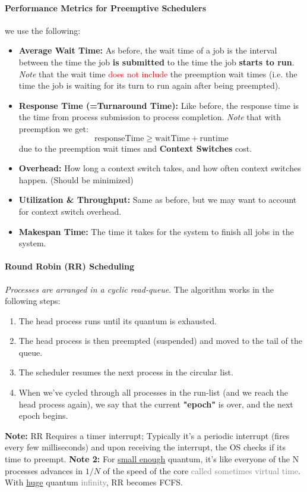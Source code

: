 \documentclass[openany,12pt]{book}
\newcommand{\red}[1]{\textcolor{Red}{#1}}
\newcommand{\gray}[1]{\textcolor{gray}{#1}}
\begin{document}
\paragraph{Performance Metrics for Preemptive Schedulers} we use the following:
\begin{itemize}
  \item \textbf{Average Wait Time:} As before, the wait time of a job is the interval between the time the job \textbf{is submitted} to the time the job \textbf{starts to run}. \textit{Note} that the wait time \red{does not include} the preemption wait times (i.e. the time the job is waiting for its turn to run again after being preempted).

  \item \textbf{Response Time (=Turnaround Time):} Like before, the response time is the time from process submission to process completion. \textit{Note} that with preemption we get:
        \begin{equation*}
          \text{responseTime} \geq \text{waitTime} + \text{runtime}
        \end{equation*}
        due to the preemption wait times and \textbf{Context Switches} cost.

  \item \textbf{Overhead:} How long a context switch takes, and how often context switches happen. (Should be minimized)

  \item \textbf{Utilization \& Throughput:} Same as before, but we may want to account for context switch overhead.

  \item \textbf{Makespan Time:} The time it takes for the system to finish all jobs in the system.

\end{itemize}


\paragraph{Round Robin (RR) Scheduling} \textit{Processes are arranged in a cyclic read-queue}. The algorithm works in the following steps:
\begin{enumerate}
  \item  The head process runs until its quantum is exhausted.
  \item The head process is then preempted (suspended) and moved to the tail of the queue.
  \item The scheduler resumes the next process in the circular list.
  \item When we've cycled through all processes in the run-list (and we reach the head process again), we say that the current \textbf{"epoch"} is over, and the next epoch begins.
\end{enumerate}
\textbf{Note:} RR Requires a timer interrupt; Typically it's a periodic interrupt (fires every few milliseconds) and upon receiving the interrupt, the OS checks if its time to preempt.
\textbf{Note 2:} For \ul{small enough} quantum, it's like everyone of the N processes advances in \(1/N\) of the speed of the core \gray{called sometimes virtual time}.
With \ul{huge} quantum \gray{infinity}, RR becomes FCFS.
\end{document}
